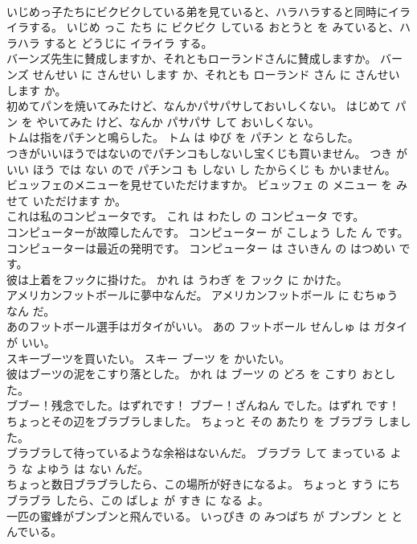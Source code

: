 \documentclass[8pt]{extreport}
\begin{document}
\begin{CJK}{UTF8}{min}
\\	いじめっ子たちにビクビクしている弟を見ていると、ハラハラすると同時にイライラする。	いじめ っこ たち に ビクビク している おとうと を みていると、ハラハラ すると どうじに イライラ する。	
\\	バーンズ先生に賛成しますか、それともローランドさんに賛成しますか。	バーンズ せんせい に さんせい します か、それとも ローランド さん に さんせい します か。	
\\	初めてパンを焼いてみたけど、なんかパサパサしておいしくない。	はじめて パン を やいてみた けど、なんか パサパサ して おいしくない。	
\\	トムは指をパチンと鳴らした。	トム は ゆび を パチン と ならした。	
\\	つきがいいほうではないのでパチンコもしないし宝くじも買いません。	つき が いい ほう では ない ので パチンコ も しない し たからくじ も かいません。	
\\	ビュッフェのメニューを見せていただけますか。	ビュッフェ の メニュー を みせて いただけます か。	
\\	これは私のコンピュータです。	これ は わたし の コンピュータ です。	
\\	コンピューターが故障したんです。	コンピューター が こしょう した ん です。	
\\	コンピューターは最近の発明です。	コンピューター は さいきん の はつめい です。	
\\	彼は上着をフックに掛けた。	かれ は うわぎ を フック に かけた。	
\\	アメリカンフットボールに夢中なんだ。	アメリカンフットボール に むちゅう なん だ。	
\\	あのフットボール選手はガタイがいい。	あの フットボール せんしゅ は ガタイ が いい。	
\\	スキーブーツを買いたい。	スキー ブーツ を かいたい。	
\\	彼はブーツの泥をこすり落とした。	かれ は ブーツ の どろ を こすり おとした。	
\\	ブブー！残念でした。はずれです！	ブブー！ざんねん でした。はずれ です！	
\\	ちょっとその辺をブラブラしました。	ちょっと その あたり を ブラブラ しました。	
\\	ブラブラして待っているような余裕はないんだ。	ブラブラ して まっている よう な よゆう は ない んだ。	
\\	ちょっと数日ブラブラしたら、この場所が好きになるよ。	ちょっと すう にち ブラブラ したら、この ばしょ が すき に なる よ。	
\\	一匹の蜜蜂がブンブンと飛んでいる。	いっぴき の みつばち が ブンブン と とんでいる。	

\end{CJK}
\end{document}
